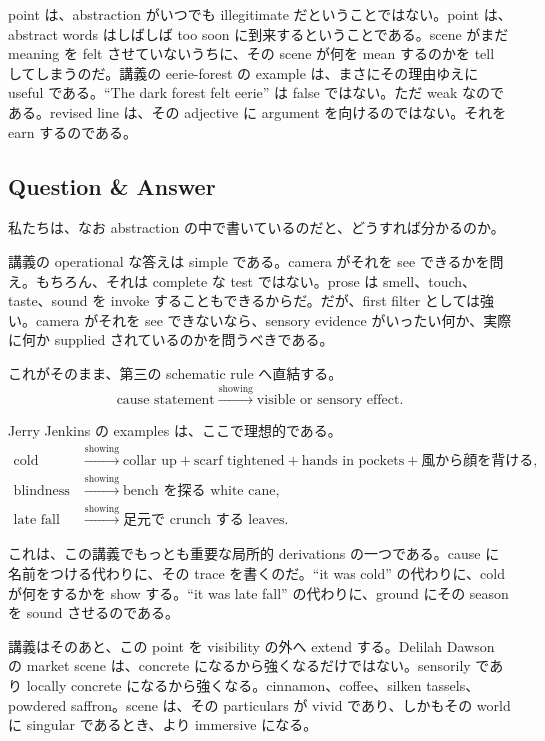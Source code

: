 point は、abstraction がいつでも illegitimate だということではない。point は、abstract words はしばしば too soon に到来するということである。scene がまだ meaning を felt させていないうちに、その scene が何を mean するのかを tell してしまうのだ。講義の eerie-forest の example は、まさにその理由ゆえに useful である。``The dark forest felt eerie'' は false ではない。ただ weak なのである。revised line は、その adjective に argument を向けるのではない。それを earn するのである。

\subsection{Question \& Answer}

私たちは、なお abstraction の中で書いているのだと、どうすれば分かるのか。

講義の operational な答えは simple である。camera がそれを see できるかを問え。もちろん、それは complete な test ではない。prose は smell、touch、taste、sound を invoke することもできるからだ。だが、first filter としては強い。camera がそれを see できないなら、sensory evidence がいったい何か、実際に何か supplied されているのかを問うべきである。

これがそのまま、第三の schematic rule へ直結する。
\begin{equation}
\text{cause statement} \xrightarrow{\text{showing}} \text{visible or sensory effect}.
\end{equation}

Jerry Jenkins の examples は、ここで理想的である。
\begin{align}
\text{cold}
&\xrightarrow{\text{showing}}
\text{collar up} + \text{scarf tightened} + \text{hands in pockets} + \text{風から顔を背ける},\\
\text{blindness}
&\xrightarrow{\text{showing}}
\text{bench を探る white cane},\\
\text{late fall}
&\xrightarrow{\text{showing}}
\text{足元で crunch する leaves}.
\end{align}

これは、この講義でもっとも重要な局所的 derivations の一つである。cause に名前をつける代わりに、その trace を書くのだ。``it was cold'' の代わりに、cold が何をするかを show する。``it was late fall'' の代わりに、ground にその season を sound させるのである。

講義はそのあと、この point を visibility の外へ extend する。Delilah Dawson の market scene は、concrete になるから強くなるだけではない。sensorily であり locally concrete になるから強くなる。cinnamon、coffee、silken tassels、powdered saffron。scene は、その particulars が vivid であり、しかもその world に singular であるとき、より immersive になる。

